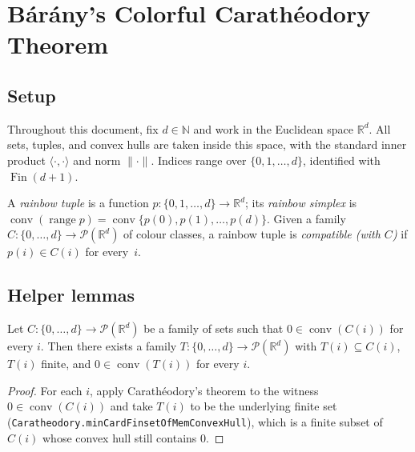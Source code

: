 


\section*{Bárány's Colorful Carathéodory Theorem}

\subsection*{Setup}

Throughout this document, fix \(d \in \mathbb{N}\) and work in the
Euclidean space \(\mathbb{R}^d\). All sets, tuples, and convex hulls
are taken inside this space, with the standard inner product
\(\langle \cdot, \cdot \rangle\) and norm \(\|\cdot\|\). Indices range
over \(\{0, 1, \dots, d\}\), identified with \(\operatorname{Fin}(d+1)\).

A \emph{rainbow tuple} is a function
\(p : \{0, 1, \dots, d\} \to \mathbb{R}^d\); its \emph{rainbow simplex}
is \(\operatorname{conv}(\operatorname{range} p)
   = \operatorname{conv}\{p(0), p(1), \dots, p(d)\}\).
Given a family \(C : \{0, \dots, d\} \to \mathcal{P}(\mathbb{R}^d)\) of
colour classes, a rainbow tuple is \emph{compatible (with \(C\))} if
\(p(i) \in C(i)\) for every~\(i\).

\subsection*{Helper lemmas}

\begin{lemma}
\label{lem:cc_finite_reduction}
\leanok
Let \(C : \{0,\dots,d\} \to \mathcal{P}(\mathbb{R}^d)\) be a family of
sets such that \(0 \in \operatorname{conv}(C(i))\) for every \(i\).
Then there exists a family
\(T : \{0,\dots,d\} \to \mathcal{P}(\mathbb{R}^d)\) with
\(T(i) \subseteq C(i)\), \(T(i)\) finite, and
\(0 \in \operatorname{conv}(T(i))\) for every \(i\).
\end{lemma}

\begin{proof}
\leanok
For each \(i\), apply Carathéodory's theorem to the witness
\(0 \in \operatorname{conv}(C(i))\) and take \(T(i)\) to be the
underlying finite set
(\texttt{Caratheodory.minCardFinsetOfMemConvexHull}), which is a
finite subset of \(C(i)\) whose convex hull still contains \(0\).
\end{proof}

